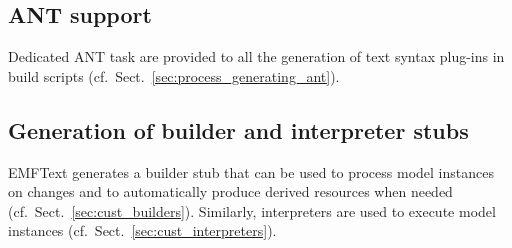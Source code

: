\subsection{ANT support}

Dedicated ANT task are provided to all the generation of text syntax plug-ins 
in build scripts (cf.~Sect.~\ref{sec:process_generating_ant}).

\subsection{Generation of builder and interpreter stubs}

EMFText generates a builder stub that can be used to process model instances 
on changes and to automatically produce derived resources when needed 
(cf.~Sect.~\ref{sec:cust_builders}). Similarly, interpreters are used to 
execute model instances (cf.~Sect.~\ref{sec:cust_interpreters}).